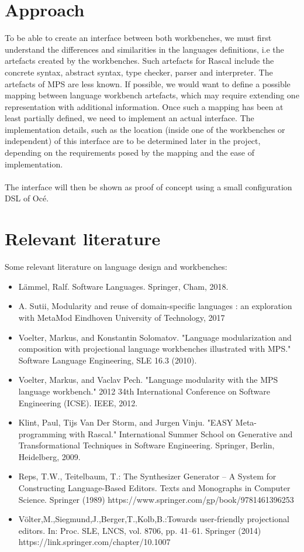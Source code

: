 \documentclass[a4paper, 11pt]{article}
\begin{document}
\section*{Approach}
To be able to create an interface between both workbenches, we must first understand the differences and similarities in the languages definitions, i.e the artefacts created by the workbenches. Such artefacts for Rascal include the concrete syntax, abstract syntax, type checker, parser and interpreter. The artefacts of MPS are less known. If possible, we would want to define a possible mapping between language workbench artefacts, which may require extending one representation with additional information. Once such a mapping has been at least partially defined, we need to implement an actual interface. The implementation details, such as the location (inside one of the workbenches or independent) of this interface are to be determined later in the project, depending on the requirements posed by the mapping and the ease of implementation.\\\\
The interface will then be shown as proof of concept using a small configuration DSL of Océ.

\section*{Relevant literature}
Some relevant literature on language design and workbenches:
\begin{itemize}
	\item Lämmel, Ralf. Software Languages. Springer, Cham, 2018.
	\item A. Sutii, Modularity and reuse of domain-specific languages : an exploration with MetaMod Eindhoven University of Technology, 2017
	\item Voelter, Markus, and Konstantin Solomatov. "Language modularization and composition with projectional language workbenches illustrated with MPS." Software Language Engineering, SLE 16.3 (2010).
	\item Voelter, Markus, and Vaclav Pech. "Language modularity with the MPS language workbench." 2012 34th International Conference on Software Engineering (ICSE). IEEE, 2012.
	\item Klint, Paul, Tijs Van Der Storm, and Jurgen Vinju. "EASY Meta-programming with Rascal." International Summer School on Generative and Transformational Techniques in Software Engineering. Springer, Berlin, Heidelberg, 2009.
	\item Reps, T.W., Teitelbaum, T.: The Synthesizer Generator – A System for Constructing
	Language-Based Editors. Texts and Monographs in Computer Science. Springer (1989)
	https://www.springer.com/gp/book/9781461396253
	\item Völter,M.,Siegmund,J.,Berger,T.,Kolb,B.:Towards user-friendly projectional editors. In:
	Proc. SLE, LNCS, vol. 8706, pp. 41–61. Springer (2014)
	https://link.springer.com/chapter/10.1007%
	
\end{itemize}
\end{document}

